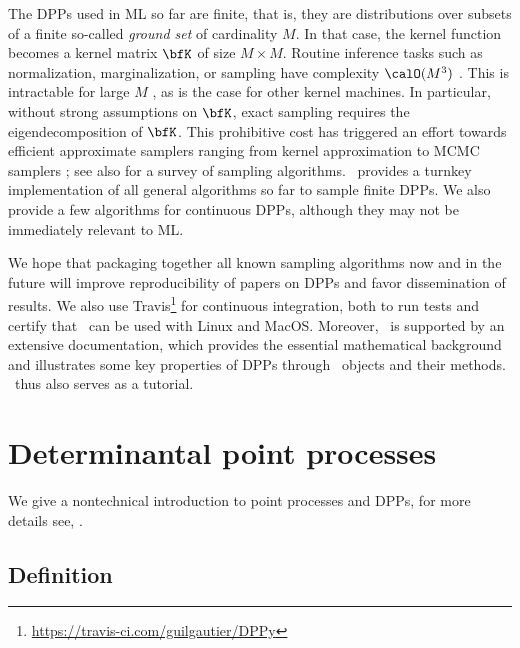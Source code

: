 \documentclass[twoside,11pt]{article}
\begin{document}
  The DPPs used in ML so far are finite, that is, they are distributions over subsets of a finite so-called \emph{ground set} of cardinality $M$. 
  In that case, the kernel function becomes a kernel matrix $\bfK$ of size $M\times M$. 
  Routine inference tasks such as normalization, marginalization, or sampling have complexity $\calO(M^3)$ \citep{KuTa12}. 
  This is intractable for large $M$ \citep{Gil14}, as is the case for other kernel machines.   
  In particular, without strong assumptions on $\bfK$, exact sampling requires the eigendecomposition of $\bfK$.
  This prohibitive cost has triggered an effort towards efficient approximate samplers ranging from kernel approximation \citep{AKFT13} to MCMC samplers \citep{AnGhRe16, LiJeSr16c, GaBaVa17}; see also \citet{TrBaAm18} for a survey of sampling algorithms.
  \DPPy\ provides a turnkey implementation of all general algorithms so far to sample finite DPPs. 
  We also provide a few algorithms for continuous DPPs, although they may not be immediately relevant to ML.


  We hope that packaging together all known sampling algorithms now and in the future will improve reproducibility of papers on DPPs and favor dissemination of results. 
  \setcounter{footnote}{5}
  We also use Travis\footnote{\url{https://travis-ci.com/guilgautier/DPPy}} for continuous integration, both to run tests and certify that \DPPy\ can be used with Linux and MacOS.
  Moreover, \DPPy\ is supported by an extensive documentation, which provides the essential mathematical background and illustrates some key properties of DPPs through \DPPy\ objects and their methods. \DPPy\ thus also serves as a tutorial.


\section{Determinantal point processes} %
\label{sec:determinantal_point_processes}

	We give a nontechnical introduction to point processes and DPPs, for more details see, \eg \citet{HKPV06}.

  \subsection{Definition} %
  \label{sub:definition}
\end{document}
